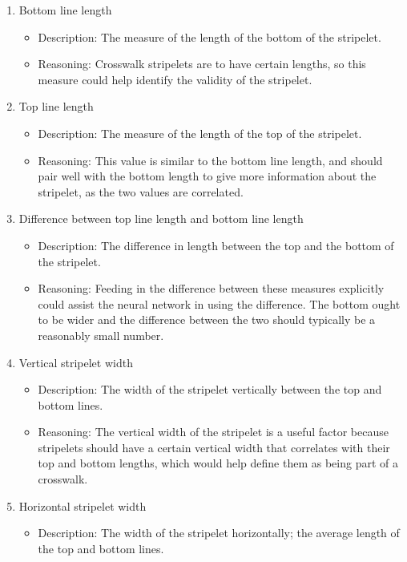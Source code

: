 \documentclass[12pt]{ucthesis}
\begin{document}
\begin{enumerate}
   \item Bottom line length
   \begin{itemize}
     \item Description: The measure of the length of the bottom of the stripelet.
     \item Reasoning: Crosswalk stripelets are to have certain lengths, so this measure could help identify the validity of the stripelet.
   \end{itemize}
   \item Top line length
   \begin{itemize}
    \item Description: The measure of the length of the top of the stripelet.
    \item Reasoning: This value is similar to the bottom line length, and should pair well with the bottom length to give more information about the stripelet, as the two values are correlated.
   \end{itemize}
   \item Difference between top line length and bottom line length
   \begin{itemize}
     \item Description: The difference in length between the top and the bottom of the stripelet.
     \item Reasoning: Feeding in the difference between these measures explicitly could assist the neural network in using the difference. The bottom ought to be wider and the difference between the two should typically be a reasonably small number. 
   \end{itemize}
   \item Vertical stripelet width
   \begin{itemize}
     \item Description: The width of the stripelet vertically between the top and bottom lines.
     \item Reasoning: The vertical width of the stripelet is a useful factor because stripelets should have a certain vertical width that correlates with their top and bottom lengths, which would help define them as being part of a crosswalk.
   \end{itemize}
   \item Horizontal stripelet width
   \begin{itemize}
     \item Description: The width of the stripelet horizontally; the average length of the top and bottom lines.

\end{itemize}
\end{enumerate}
\end{document}
